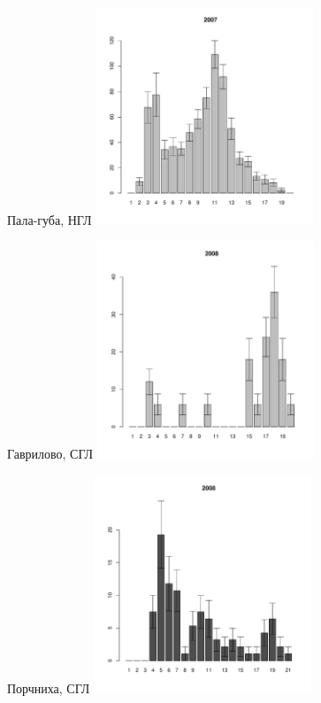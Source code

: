 \begin{figure}[hp]
\begin{minipage}[b]{.46\linewidth}
\begin{center}
	\end{center}
	\end{minipage}
	\hfil %
	\begin{minipage}[b]{.46\linewidth}
	\begin{center}	
	{\tiny Пала-губа, НГЛ}
	\includegraphics[width=65mm]{../Barenc_Sea/Pala/low_2007_.pdf}
	\end{center}
	\end{minipage}
	\begin{minipage}[b]{.46\linewidth}
	\begin{center}
	{\tiny Гаврилово, СГЛ}
	\includegraphics[width=65mm]{../Barenc_Sea/Gavrilovo/middle_2008_.pdf}
	\end{center}
	\end{minipage}
	\hfil %
	\begin{minipage}[b]{.46\linewidth}
	\begin{center}
	{\tiny Порчниха, СГЛ}
	\includegraphics[width=65mm]{../Barenc_Sea/Porchnikha/sizestr2007.pdf}

\end{center}
\end{minipage}
\end{figure}
